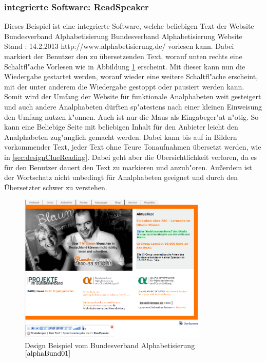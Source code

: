 \subsubsection{ integrierte Software: ReadSpeaker}

Dieses Beispiel ist eine integrierte Software, welche beliebigen Text der Website Bundesverband Alphabetisierung
						{Bundesverband Alphabetisierung Website}
						{Stand : 14.2.2013}
						{http://www.alphabetisierung.de/}
vorlesen kann.
Dabei markiert der Benutzer den zu übersetzenden Text, worauf unten rechts eine Schaltfl"ache \glqq Vorlesen \grqq wie in Abbildung  \ref{fig:DesignBeispiel1} erscheint. Mit dieser kann nun die Wiedergabe gestartet werden, worauf wieder eine weitere Schaltfl"ache erscheint, mit der unter anderem die Wiedergabe gestoppt oder pausiert werden kann.\\
Somit wird der Umfang der Website für funktionale Analphabeten weit gesteigert und auch andere Analphabeten dürften sp"atestens nach einer kleinen Einweisung den Umfang nutzen k"onnen. Auch ist nur die Maus als Eingabeger"at n"otig. So kann eine Beliebige Seite mit beliebigen Inhalt für den Anbieter leicht den Analphabeten zug"anglich gemacht werden. Dabei kann bis auf in Bildern vorkommender Text, jeder Text ohne Teure Tonaufnahmen übersetzt werden, wie in \ref{sec:designClueReading}. Dabei geht aber die Übersichtlichkeit verloren, da es für den Benutzer dauert den Text zu markieren und anzuh"oren. Außerdem ist der Wortschatz nicht unbedingt für Analphabeten geeignet und durch den Übersetzter schwer zu verstehen.
\begin{figure}[h]
	\centering
		\includegraphics[width=0.80\textwidth]{Daten/DesignBeispiel1.png}
	\caption{Design Beispiel vom Bundesverband Alphabetisierung $^{\ref{alphaBund01}}$}
	\label{fig:DesignBeispiel1}
\end{figure}

